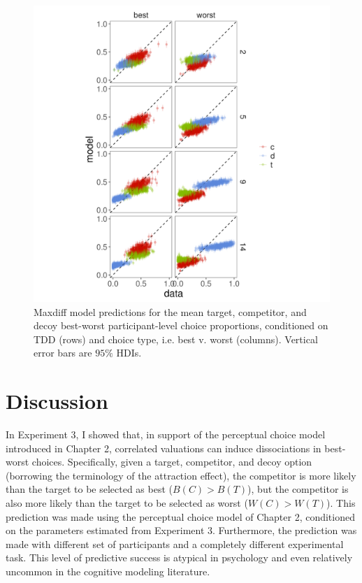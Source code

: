\begin{figure}
   \includegraphics[width=\linewidth]{figures/maxdiff_1_subjectmeans_model_v_data.jpeg}
   \caption{Maxdiff model predictions for the mean target, competitor, and decoy best-worst participant-level choice proportions, conditioned on TDD (rows) and choice type, i.e. best v. worst (columns). Vertical error bars are $95\%$ HDIs.}
   \label{fig:maxdiff_sub_preds}
\end{figure}

\section{Discussion}
In Experiment 3, I showed that, in support of the perceptual choice model introduced in Chapter 2, correlated valuations can induce dissociations in best-worst choices. Specifically, given a target, competitor, and decoy option (borrowing the terminology of the attraction effect), the competitor is more likely than the target to be selected as best ($B(C)>B(T)$), but the competitor is also more likely than the target to be selected as worst ($W(C)>W(T)$). This prediction was made using the perceptual choice model of Chapter 2, conditioned on the parameters estimated from Experiment 3. Furthermore, the prediction was made with different set of participants and a completely different experimental task. This level of predictive success is atypical in psychology and even relatively uncommon in the cognitive modeling literature. 

